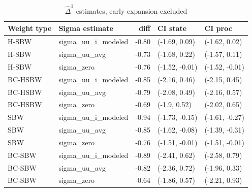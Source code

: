 \begin{table}[ht]
\centering
\caption{$\hat{\Delta}^1$ estimates, early expansion excluded}
\label{tab:deltac2}
\begin{tabular}{llrll}
  \hline
Weight type & Sigma estimate & diff & CI state & CI proc \\ 
  \hline
H-SBW & sigma\_uu\_i\_modeled & -0.80 & (-1.69, 0.09) & (-1.62, 0.02) \\ 
  H-SBW & sigma\_uu\_avg & -0.73 & (-1.68, 0.22) & (-1.57, 0.11) \\ 
  H-SBW & sigma\_zero & -0.76 & (-1.52, -0.01) & (-1.52, -0.01) \\ 
  BC-HSBW & sigma\_uu\_i\_modeled & -0.85 & (-2.16, 0.46) & (-2.15, 0.45) \\
  BC-HSBW & sigma\_uu\_avg & -0.79 & (-2.08, 0.49) & (-2.16, 0.57) \\ 
  BC-HSBW & sigma\_zero & -0.69 & (-1.9, 0.52) & (-2.02, 0.65) \\ 
  SBW & sigma\_uu\_i\_modeled & -0.94 & (-1.73, -0.15) & (-1.61, -0.27) \\ 
  SBW & sigma\_uu\_avg & -0.85 & (-1.62, -0.08) & (-1.39, -0.31) \\ 
  SBW & sigma\_zero & -0.76 & (-1.51, -0.01) & (-1.51, -0.01) \\ 
  BC-SBW & sigma\_uu\_i\_modeled & -0.89 & (-2.41, 0.62) & (-2.58, 0.79) \\ 
  BC-SBW & sigma\_uu\_avg & -0.82 & (-2.36, 0.72) & (-1.96, 0.33) \\ 
  BC-SBW & sigma\_zero & -0.64 & (-1.86, 0.57) & (-2.21, 0.93) \\ 
   \hline
\end{tabular}
\end{table}

